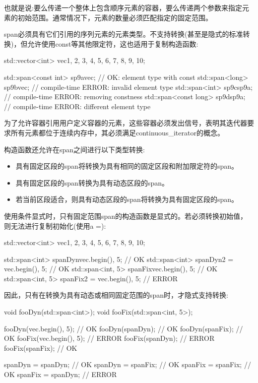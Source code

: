 也就是说:要么传递一个整体上包含顺序元素的容器，要么传递两个参数来指定元素的初始范围。通常情况下，元素的数量必须匹配指定的固定范围。


span必须具有它们引用的序列元素的元素类型。不支持转换(甚至是隐式的标准转换)，但允许使用const等其他限定符，这也适用于复制构造函数:

\begin{cpp}
std::vector<int> vec{1, 2, 3, 4, 5, 6, 7, 8, 9, 10};

std::span<const int> sp9a{vec}; // OK: element type with const
std::span<long> sp9b{vec}; // compile-time ERROR: invalid element type
std::span<int> sp9c{sp9a}; // compile-time ERROR: removing constness
std::span<const long> sp9d{sp9a}; // compile-time ERROR: different element type
\end{cpp}

为了允许容器引用用户定义容器的元素，这些容器必须发出信号，表明其迭代器要求所有元素都位于连续内存中，其必须满足continuous\_iterator的概念。

构造函数还允许在span之间进行以下类型转换:

\begin{itemize}
\item
具有固定区段的span将转换为具有相同的固定区段和附加限定符的span。

\item
具有固定区段的span转换为具有动态区段的span。

\item
若当前区段适合，则具有动态区段的span将转换为具有固定区段的span。
\end{itemize}

使用条件显式时，只有固定范围span的构造函数是显式的。若必须转换初始值，则无法进行复制初始化(使用a =):

\begin{cpp}
std::vector<int> vec{1, 2, 3, 4, 5, 6, 7, 8, 9, 10};

std::span<int> spanDyn{vec.begin(), 5}; // OK
std::span<int> spanDyn2 = {vec.begin(), 5}; // OK
std::span<int, 5> spanFix{vec.begin(), 5}; // OK
std::span<int, 5> spanFix2 = {vec.begin(), 5}; // ERROR
\end{cpp}

因此，只有在转换为具有动态或相同固定范围的span时，才隐式支持转换:

\begin{cpp}
void fooDyn(std::span<int>);
void fooFix(std::span<int, 5>);

fooDyn({vec.begin(), 5}); // OK
fooDyn(spanDyn); // OK
fooDyn(spanFix); // OK
fooFix({vec.begin(), 5}); // ERROR
fooFix(spanDyn); // ERROR
fooFix(spanFix); // OK

spanDyn = spanDyn; // OK
spanDyn = spanFix; // OK
spanFix = spanFix; // OK
spanFix = spanDyn; // ERROR
\end{cpp}

